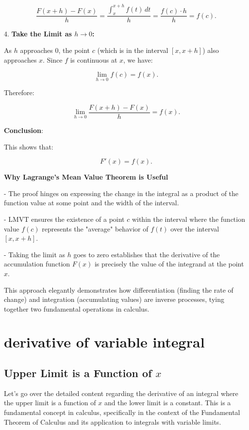 \documentclass[a4paper,12pt]{book}
\begin{document}
   \[
   \dfrac{F(x + h) - F(x)}{h} = \dfrac{\int_{x}^{x + h} f(t) \, dt}{h} = \dfrac{f(c) \cdot h}{h} = f(c).
   \]

4. \textbf{Take the Limit as \( h \to 0 \):}

   As \( h \) approaches \( 0 \), the point \( c \) (which is in the interval \([x, x + h]\)) also approaches \( x \). Since \( f \) is continuous at \( x \), we have:

   \[
   \lim_{h \to 0} f(c) = f(x).
   \]

   Therefore:

   \[
   \lim_{h \to 0} \dfrac{F(x + h) - F(x)}{h} = f(x).
   \]

\textbf{Conclusion}:

This shows that:

\[
F'(x) = f(x).
\]

\textbf{Why Lagrange's Mean Value Theorem is Useful}

- The proof hinges on expressing the change in the integral as a product of the function value at some point and the width of the interval.

- LMVT ensures the existence of a point \( c \) within the interval where the function value \( f(c) \) represents the "average" behavior of \( f(t) \) over the interval \([x, x + h]\).

- Taking the limit as \( h \) goes to zero establishes that the derivative of the accumulation function \( F(x) \) is precisely the value of the integrand at the point \( x \).

This approach elegantly demonstrates how differentiation (finding the rate of change) and integration (accumulating values) are inverse processes, tying together two fundamental operations in calculus.

\section{derivative of variable integral}

\subsection{Upper Limit is a Function of \texorpdfstring{\(x\)}{x}}

Let's go over the detailed content regarding the derivative of an integral where the upper limit is a function of \( x \) and the lower limit is a constant. This is a fundamental concept in calculus, specifically in the context of the Fundamental Theorem of Calculus and its application to integrals with variable limits.
\end{document}

